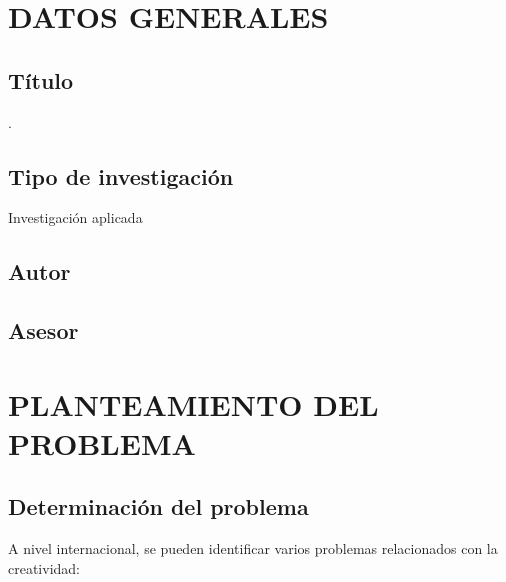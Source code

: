 \documentclass[12pt,a4paper]{article}
\begin{document}
\flushbottom






\section{DATOS GENERALES}
\subsection{Título} \titulo.
\subsection{Tipo de investigación} Investigación aplicada
\subsection{Autor} \autor
\subsection{Asesor} \asesor

\section{PLANTEAMIENTO DEL PROBLEMA}
\subsection{Determinación del problema}


A nivel internacional, se pueden identificar varios problemas relacionados con la creatividad:
\end{document}
